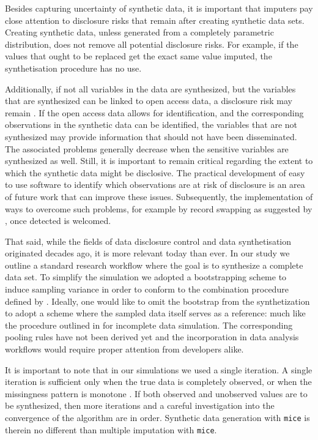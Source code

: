 \documentclass[psych,article,submit,moreauthors,pdftex]{mdpi}
\begin{document}
Besides capturing uncertainty of synthetic data, it is important that
imputers pay close attention to disclosure risks that remain after
creating synthetic data sets. Creating synthetic data, unless generated
from a completely parametric distribution, does not remove all potential
disclosure risks. For example, if the values that ought to be replaced
get the exact same value imputed, the synthetisation procedure has no
use.

Additionally, if not all variables in the data are synthesized, but the
variables that are synthesized can be linked to open access data, a
disclosure risk may remain \citep{drechsler2011empirical}. If the open
access data allows for identification, and the corresponding
observations in the synthetic data can be identified, the variables that
are not synthesized may provide information that should not have been
disseminated. The associated problems generally decrease when the
sensitive variables are synthesized as well. Still, it is important to
remain critical regarding the extent to which the synthetic data might
be disclosive. The practical development of easy to use software to
identify which observations are at risk of disclosure is an area of
future work that can improve these issues. Subsequently, the
implementation of ways to overcome such problems, for example by record
swapping as suggested by \citet{jiang2021balancing}, once detected is
welcomed.

That said, while the fields of data disclosure control and data
synthetisation originated decades ago, it is more relevant today than
ever. In our study we outline a standard research workflow where the
goal is to synthesize a complete data set. To simplify the simulation we
adopted a bootstrapping scheme to induce sampling variance in order to
conform to the combination procedure defined by
\citet{reiter_partially_inference_2003}. Ideally, one would like to omit
the bootstrap from the synthetization to adopt a scheme where the
sampled data itself serves as a reference: much like the procedure
outlined in \citet{vink2014pooling} for incomplete data simulation. The
corresponding pooling rules have not been derived yet and the
incorporation in data analysis workflows would require proper attention
from developers alike.

It is important to note that in our simulations we used a single
iteration. A single iteration is sufficient only when the true data is
completely observed, or when the missingness pattern is monotone
\citep{drechsler_synthetic_2011}. If both observed and unobserved values
are to be synthesized, then more iterations and a careful investigation
into the convergence of the algorithm are in order. Synthetic data
generation with \texttt{mice} is therein no different than multiple
imputation with \texttt{mice}.
\end{document}
